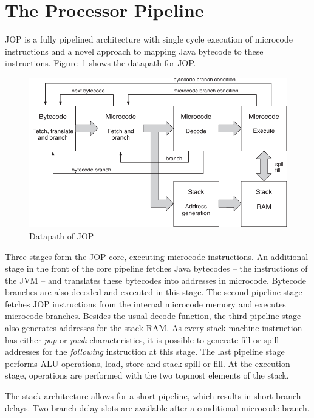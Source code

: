 \section{The Processor Pipeline}
\label{sec:pipeline}

JOP is a fully pipelined architecture with single cycle execution of
microcode instructions and a novel approach to mapping Java bytecode
to these instructions. Figure~\ref{fig_arch_pipeline} shows the
datapath for JOP.

\begin{figure}
    \centering
    \includegraphics[scale=\picscale]{arch/arch_pipeline}
    \caption{Datapath of JOP}
    \label{fig_arch_pipeline}
\end{figure}

Three stages form the JOP core, executing microcode instructions. An
additional stage in the front of the core pipeline fetches Java
bytecodes -- the instructions of the JVM -- and translates these
bytecodes into addresses in microcode. Bytecode branches are also
decoded and executed in this stage. The second pipeline stage
fetches JOP instructions from the internal microcode memory and
executes microcode branches. Besides the usual decode function, the
third pipeline stage also generates addresses for the stack RAM. As
every stack machine instruction has either \emph{pop} or \emph{push}
characteristics, it is possible to generate fill or spill addresses
for the \emph{following} instruction at this stage. The last
pipeline stage performs ALU operations, load, store and stack spill
or fill. At the execution stage, operations are performed with the
two topmost elements of the stack.

The stack architecture allows for a short pipeline, which results in
short branch delays. Two branch delay slots are available after a
conditional microcode branch.

